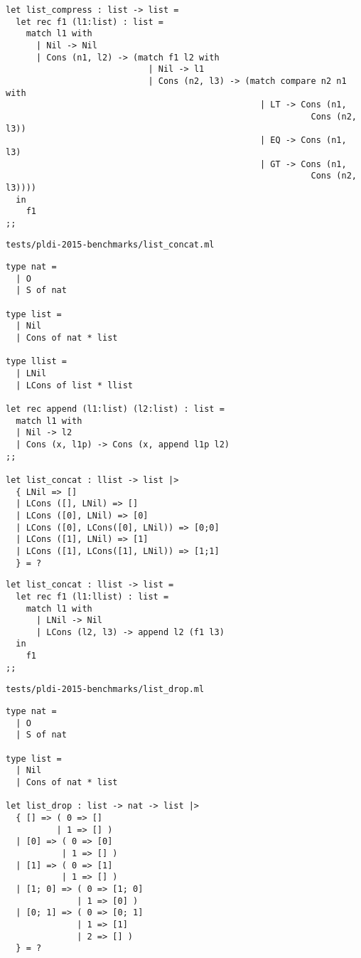 \begin{verbatim}
let list_compress : list -> list =
  let rec f1 (l1:list) : list =
    match l1 with
      | Nil -> Nil
      | Cons (n1, l2) -> (match f1 l2 with
                            | Nil -> l1
                            | Cons (n2, l3) -> (match compare n2 n1 with
                                                  | LT -> Cons (n1,
                                                            Cons (n2, l3))
                                                  | EQ -> Cons (n1, l3)
                                                  | GT -> Cons (n1,
                                                            Cons (n2, l3))))
  in
    f1
;;
\end{verbatim}

\noindent\large\texttt{tests/pldi-2015-benchmarks/list\_concat.ml}
\begin{verbatim}
type nat =
  | O
  | S of nat

type list =
  | Nil
  | Cons of nat * list

type llist =
  | LNil
  | LCons of list * llist

let rec append (l1:list) (l2:list) : list =
  match l1 with
  | Nil -> l2
  | Cons (x, l1p) -> Cons (x, append l1p l2)
;;

let list_concat : llist -> list |>
  { LNil => []
  | LCons ([], LNil) => []
  | LCons ([0], LNil) => [0]
  | LCons ([0], LCons([0], LNil)) => [0;0]
  | LCons ([1], LNil) => [1]
  | LCons ([1], LCons([1], LNil)) => [1;1]
  } = ?
\end{verbatim}

\begin{verbatim}
let list_concat : llist -> list =
  let rec f1 (l1:llist) : list =
    match l1 with
      | LNil -> Nil
      | LCons (l2, l3) -> append l2 (f1 l3)
  in
    f1
;;
\end{verbatim}

\noindent\large\texttt{tests/pldi-2015-benchmarks/list\_drop.ml}
\begin{verbatim}
type nat =
  | O
  | S of nat

type list =
  | Nil
  | Cons of nat * list

let list_drop : list -> nat -> list |>
  { [] => ( 0 => []
          | 1 => [] )
  | [0] => ( 0 => [0]
           | 1 => [] )
  | [1] => ( 0 => [1]
           | 1 => [] )
  | [1; 0] => ( 0 => [1; 0]
              | 1 => [0] )
  | [0; 1] => ( 0 => [0; 1]
              | 1 => [1]
              | 2 => [] )
  } = ?
\end{verbatim}

